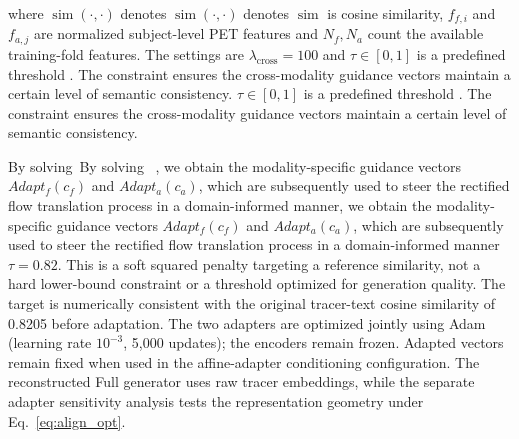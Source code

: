 \documentclass{article}
\providecommand{\DIFaddtex}[1]{{\protect\color{blue} \sf #1}} %
\providecommand{\DIFdeltex}[1]{{\protect\color{red} \ifmmode #1\else\scriptsize #1\fi}} %
\providecommand{\DIFaddbegin}{} %
\providecommand{\DIFaddend}{} %
\providecommand{\DIFdelbegin}{} %
\providecommand{\DIFdelend}{} %
\providecommand{\DIFadd}[1]{\texorpdfstring{\DIFaddtex{#1}}{#1}} %
\providecommand{\DIFdel}[1]{\texorpdfstring{\DIFdeltex{#1}}{}} %
\newcommand{\DIFscaledelfig}{0.5}
\newlength{\DIFdelgraphicswidth} %
\newlength{\DIFdelgraphicsheight} %
\newcommand{\DIFaddincludegraphics}[2][]{{\color{blue}\fbox{\DIFOincludegraphics[#1]{#2}}}} %
\newcommand{\DIFdelincludegraphics}[2][]{%
\sbox{\DIFdelgraphicsbox}{\DIFOincludegraphics[#1]{#2}}%
\settoboxwidth{\DIFdelgraphicswidth}{\DIFdelgraphicsbox} %
\settoboxtotalheight{\DIFdelgraphicsheight}{\DIFdelgraphicsbox} %
\scalebox{\DIFscaledelfig}{%
\parbox[b]{\DIFdelgraphicswidth}{\usebox{\DIFdelgraphicsbox}\\[-\baselineskip] \rule{\DIFdelgraphicswidth}{0em}}\llap{\resizebox{\DIFdelgraphicswidth}{\DIFdelgraphicsheight}{%
\setlength{\unitlength}{\DIFdelgraphicswidth}%
\begin{picture}(1,1)%
\thicklines\linethickness{2pt} %
{\color[rgb]{1,0,0}\put(0,0){\framebox(1,1){}}}%
{\color[rgb]{1,0,0}\put(0,0){\line( 1,1){1}}}%
{\color[rgb]{1,0,0}\put(0,1){\line(1,-1){1}}}%
\end{picture}%
}\hspace*{3pt}}} %
} %
\DeclareRobustCommand{\DIFaddbegin}{\DIFOaddbegin \let\includegraphics\DIFaddincludegraphics} %
\DeclareRobustCommand{\DIFaddend}{\DIFOaddend \let\includegraphics\DIFOincludegraphics} %
\DeclareRobustCommand{\DIFdelbegin}{\DIFOdelbegin \let\includegraphics\DIFdelincludegraphics} %
\DeclareRobustCommand{\DIFdelend}{\DIFOaddend \let\includegraphics\DIFOincludegraphics} %
\begin{document}
where \DIFdelbegin \DIFdel{$\operatorname{sim}(\cdot, \cdot)$ denotes }\DIFdelend \DIFaddbegin \DIFadd{$\operatorname{sim}$ is }\DIFaddend cosine similarity, \DIFaddbegin \DIFadd{$f_{f,i}$ and $f_{a,j}$ are normalized subject-level PET features and $N_f,N_a$ count the available training-fold features. The settings are $\lambda_{\mathrm{cross}}=100$ }\DIFaddend and \DIFdelbegin \DIFdel{$\tau \in [0,1]$ is a predefined threshold . The constraint ensures the cross-modality guidance vectors maintain a certain level of semantic consistency. }%

\DIFdel{By solving~}%
\DIFdel{, we obtain the modality-specific guidance vectors $Adapt_f(c_f)$ and $Adapt_a(c_a)$, which are subsequently used to steer the rectified flow translation process in a domain-informed manner}\DIFdelend \DIFaddbegin \DIFadd{$\tau=0.82$. This is a soft squared penalty targeting a reference similarity, not a hard lower-bound constraint or a threshold optimized for generation quality. The target is numerically consistent with the original tracer-text cosine similarity of 0.8205 before adaptation. The two adapters are optimized jointly using Adam (learning rate $10^{-3}$, 5,000 updates); the encoders remain frozen. Adapted vectors remain fixed when used in the affine-adapter conditioning configuration. The reconstructed Full generator uses raw tracer embeddings, while the separate adapter sensitivity analysis tests the representation geometry under Eq.~}\eqref{eq:align_opt}\DIFaddend .
\end{document}
